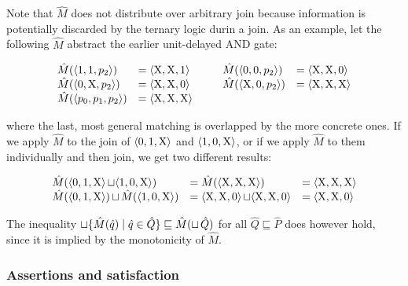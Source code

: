 Note that $\hat M$ does not distribute over arbitrary join because information is potentially discarded by the ternary logic durin a join. As an example, let the following $\hat M$ abstract the earlier unit-delayed AND gate:


\begin{equation*}
\begin{array}{llll}
  \hat M(\langle 1, 1, p_{2} \rangle) & = \langle \mathrm{X}, \mathrm{X}, 1 \rangle \qquad & \hat M(\langle 0, 0, p_{2} \rangle) & = \langle \mathrm{X}, \mathrm{X}, 0 \rangle \\
  \hat M(\langle 0, \mathrm{X}, p_{2} \rangle) & = \langle \mathrm{X}, \mathrm{X}, 0 \rangle & \hat M(\langle \mathrm{X}, 0, p_{2} \rangle) & = \langle \mathrm{X}, \mathrm{X}, \mathrm{X} \rangle \\
  \hat M(\langle p_{0}, p_{1}, p_{2} \rangle) & = \langle \mathrm{X}, \mathrm{X}, \mathrm{X} \rangle & &
\end{array}
\end{equation*}


\noindent where the last, most general matching is overlapped by the more concrete ones. If we apply $\hat M$ to the join of $\langle 0, 1, \mathrm{X} \rangle$ and $\langle 1, 0, \mathrm{X} \rangle$, or if we apply $\hat M$ to them individually and then join, we get two different results:

\begin{equation*}
\begin{array}{lll}
  \hat M(\langle 0, 1, \mathrm{X} \rangle \operatorname{\sqcup} \langle 1, 0, \mathrm{X} \rangle) &= \hat M(\langle \mathrm{X}, \mathrm{X}, \mathrm{X} \rangle) &= \langle \mathrm{X}, \mathrm{X}, \mathrm{X} \rangle \\
  \hat M(\langle 0, 1, \mathrm{X} \rangle) \operatorname{\sqcup} \hat M(\langle 1, 0, \mathrm{X} \rangle) &= \langle \mathrm{X}, \mathrm{X}, 0 \rangle \operatorname{\sqcup} \langle \mathrm{X}, \mathrm{X}, 0 \rangle &= \langle \mathrm{X}, \mathrm{X}, 0 \rangle
\end{array}
\end{equation*}

\noindent The inequality $\operatorname{\sqcup} \{ \hat M(\hat q) \mid \hat q \in \hat Q \} \sqsubseteq \hat M(\operatorname{\sqcup} \hat Q)$ for all $\hat Q \sqsubseteq \hat P$ does however hold, since it is implied by the monotonicity of $\hat M$.

\subsubsection{Assertions and satisfaction}

